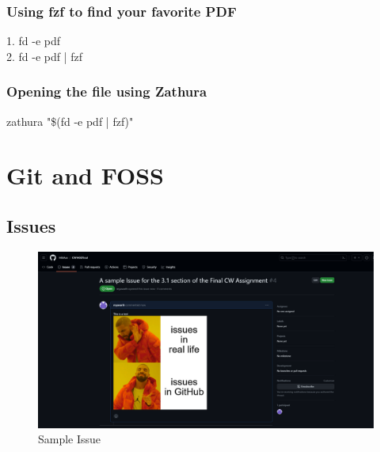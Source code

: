 \documentclass[titlepage]{article}
\begin{document}
\subsubsection{Using fzf to find your favorite PDF}
1. fd -e pdf\\
2. fd -e pdf | fzf
\subsubsection{Opening the file using Zathura}
zathura "\$(fd -e pdf | fzf)"
\section{Git and FOSS}
\subsection{Issues}
\begin{figure}[h]
	\centering
	\includegraphics[width=0.7\linewidth]{screenshot001}
	\caption{Sample Issue}
	\label{fig:screenshot001}
\end{figure}
\end{document}
